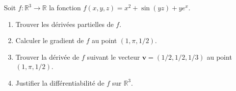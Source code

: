 \begin{exercice}\label{exoGeomAnal-0046}

Soit $f:\mathbb{R}^3\to \mathbb{R}$ la fonction $\displaystyle f(x,y,z)= x^2+\sin(yz)+ye^x.$
\begin{enumerate}
\item Trouver les dérivées partielles de $f$.
\item Calculer le gradient de $f$ au point $(1,\pi, 1/2)$.
\item Trouver la dérivée de $f$ suivant le vecteur $\mathbf{v}= (1/2, 1/2, 1/3)$ au point $(1,\pi, 1/2)$.
\item Justifier la différentiabilité de $f$ sur $\mathbb{R}^3$.
\end{enumerate}

\end{exercice}

